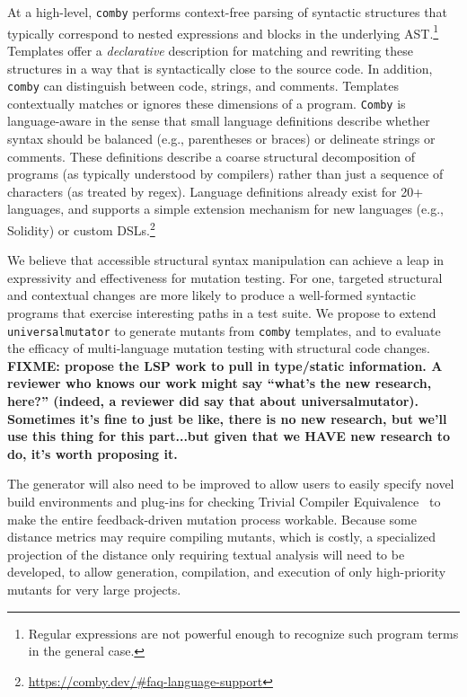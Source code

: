 At a high-level, {\tt comby} performs
context-free
parsing of syntactic structures that typically correspond to nested expressions and blocks in the underlying AST.\footnote{Regular expressions are not powerful enough to recognize such program terms in the general case.} Templates offer a \emph{declarative} description for matching and rewriting these structures in a way that is syntactically close to the source code.
In addition, {\tt comby} can distinguish between code, strings, and comments. Templates contextually matches or ignores these dimensions of a program. %
{\tt Comby} is language-aware in the sense that small language definitions describe whether syntax should be balanced (e.g., parentheses or braces) or delineate strings or comments. These definitions describe a coarse structural decomposition of programs (as typically understood by compilers) rather than just a sequence of characters (as treated by regex). Language definitions already exist for 20+ languages, and supports a simple extension mechanism for new languages (e.g., Solidity) or custom DSLs.\footnote{\url{https://comby.dev/\#faq-language-support}}

We believe that accessible structural syntax manipulation can achieve a leap in
expressivity and effectiveness for mutation testing. %
For one, targeted structural and contextual changes are
more likely to produce a well-formed syntactic programs
that exercise interesting paths in a test suite.
We propose to extend {\tt universalmutator}
to generate mutants from {\tt comby} templates, and to evaluate the efficacy of
multi-language mutation testing with structural code changes. %
\textbf{FIXME: propose the LSP work to pull in type/static information.  A
  reviewer who knows our work might say ``what's the new research, here?''
  (indeed, a reviewer did say that about universalmutator).  Sometimes it's fine
  to just be like, there is no new research, but we'll use this thing for this
  part...but given that we HAVE new research to do, it's worth proposing it.}

The generator will also need to be improved to allow users
to easily specify novel build environments and plug-ins for checking
Trivial Compiler Equivalence~\cite{TCE} to make the entire
feedback-driven mutation process workable.  Because some distance
metrics may require compiling mutants, which is costly, a specialized
projection of the distance only requiring textual analysis will need
to be developed, to allow generation, compilation, and execution of
only high-priority mutants for very large projects.

